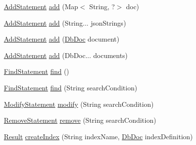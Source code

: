 \begin{DoxyCompactItemize}
\item 
\mbox{\hyperlink{interfacecom_1_1mysql_1_1cj_1_1xdevapi_1_1_add_statement}{Add\+Statement}} \mbox{\hyperlink{interfacecom_1_1mysql_1_1cj_1_1xdevapi_1_1_collection_a93ea1bd694426124c92aa5ae3bf29d2b}{add}} (Map$<$ String, ?$>$ doc)
\item 
\mbox{\hyperlink{interfacecom_1_1mysql_1_1cj_1_1xdevapi_1_1_add_statement}{Add\+Statement}} \mbox{\hyperlink{interfacecom_1_1mysql_1_1cj_1_1xdevapi_1_1_collection_aab1599c23da452aa0ad03eb89ede38a0}{add}} (String... json\+Strings)
\item 
\mbox{\hyperlink{interfacecom_1_1mysql_1_1cj_1_1xdevapi_1_1_add_statement}{Add\+Statement}} \mbox{\hyperlink{interfacecom_1_1mysql_1_1cj_1_1xdevapi_1_1_collection_a3dd00ea68a8c58d35090215f2371765f}{add}} (\mbox{\hyperlink{interfacecom_1_1mysql_1_1cj_1_1xdevapi_1_1_db_doc}{Db\+Doc}} document)
\item 
\mbox{\hyperlink{interfacecom_1_1mysql_1_1cj_1_1xdevapi_1_1_add_statement}{Add\+Statement}} \mbox{\hyperlink{interfacecom_1_1mysql_1_1cj_1_1xdevapi_1_1_collection_acb233dbad895da2bf9fbe3b26627075c}{add}} (Db\+Doc... documents)
\item 
\mbox{\hyperlink{interfacecom_1_1mysql_1_1cj_1_1xdevapi_1_1_find_statement}{Find\+Statement}} \mbox{\hyperlink{interfacecom_1_1mysql_1_1cj_1_1xdevapi_1_1_collection_acb0746735df861e86f37d50f4a6b67f0}{find}} ()
\item 
\mbox{\hyperlink{interfacecom_1_1mysql_1_1cj_1_1xdevapi_1_1_find_statement}{Find\+Statement}} \mbox{\hyperlink{interfacecom_1_1mysql_1_1cj_1_1xdevapi_1_1_collection_a3d2d6fba415d80c26d525057f628f45f}{find}} (String search\+Condition)
\item 
\mbox{\hyperlink{interfacecom_1_1mysql_1_1cj_1_1xdevapi_1_1_modify_statement}{Modify\+Statement}} \mbox{\hyperlink{interfacecom_1_1mysql_1_1cj_1_1xdevapi_1_1_collection_ad98b2d273d43ca6a029979c82e2d250a}{modify}} (String search\+Condition)
\item 
\mbox{\hyperlink{interfacecom_1_1mysql_1_1cj_1_1xdevapi_1_1_remove_statement}{Remove\+Statement}} \mbox{\hyperlink{interfacecom_1_1mysql_1_1cj_1_1xdevapi_1_1_collection_aff45631a403d8370067af7c4f0a4fab1}{remove}} (String search\+Condition)
\item 
\mbox{\hyperlink{interfacecom_1_1mysql_1_1cj_1_1xdevapi_1_1_result}{Result}} \mbox{\hyperlink{interfacecom_1_1mysql_1_1cj_1_1xdevapi_1_1_collection_a3c707f2c50914f02347a05dcfa8e77d7}{create\+Index}} (String index\+Name, \mbox{\hyperlink{interfacecom_1_1mysql_1_1cj_1_1xdevapi_1_1_db_doc}{Db\+Doc}} index\+Definition)

\end{DoxyCompactItemize}
